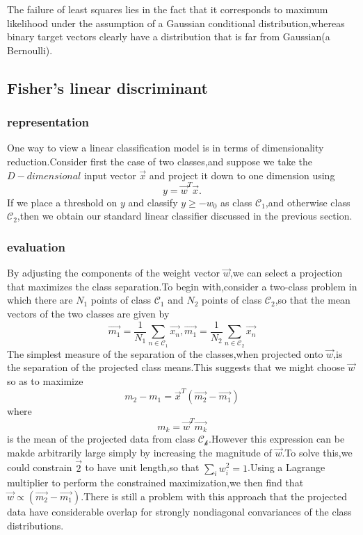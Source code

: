 The failure of least squares lies in the fact that it corresponds to maximum likelihood under the assumption of a Gaussian conditional distribution,whereas binary target vectors clearly have a distribution that is far from Gaussian(a Bernoulli).



\subsection{Fisher's linear discriminant}
\subsubsection{representation}
One way to view a linear classification model is in terms of dimensionality reduction.Consider first the case of two classes,and suppose we take the $D-dimensional$ input vector $\vec{x}$ and project it down to one dimension using
\begin{equation}\label{eqn:Fisher LDA projection}
y = \vec{w}^T\vec{x}.
\end{equation}
If we place a threshold on $y$ and classify $y \geq -w_0$ as class $\mathcal{C_1}$,and otherwise class $\mathcal{C_2}$,then we obtain our standard linear classifier discussed in the previous section.
\subsubsection{evaluation}
By adjusting the components of the weight vector $\vec{w}$,we can select a projection that maximizes the class separation.To begin with,consider a two-class problem in which there are $N_1$ points of class $\mathcal{C_1}$ and $N_2$ points of class $\mathcal{C_2}$,so that the mean vectors of the two classes are given by
\begin{equation}
\vec{m_1} = \dfrac{1}{N_1} \sum_{n\in \mathcal{C_1}}{\vec{x_n}},\vec{m_1} = \dfrac{1}{N_2}\sum_{n\in \mathcal{C_2}}\vec{x_n}
\end{equation}
The simplest measure of the separation of the classes,when projected onto $\vec{w}$,is the separation of the projected  class means.This suggests that we might choose $\vec{w}$ so as to maximize
\begin{equation}
m_2 - m_1 = \vec{x}^T(\vec{m_2}-\vec{m_1})
\end{equation}
where\begin{equation}
m_k = \vec{w}^T\vec{m_k}
\end{equation}
is the mean of the projected data from class $\mathcal{C_k}$.However this expression can be makde arbitrarily large simply by increasing the magnitude of $\vec{w}$.To solve this,we could constrain $\vec{2}$ to have unit length,so that $\sum_{i}{w_i^2}=1$.Using a Lagrange multiplier to perform the constrained maximization,we then find that $\vec{w} \propto (\vec{m_2} - \vec{m_1})$.There is still a problem with this approach that the projected data have considerable overlap for strongly nondiagonal convariances of the class distributions.

